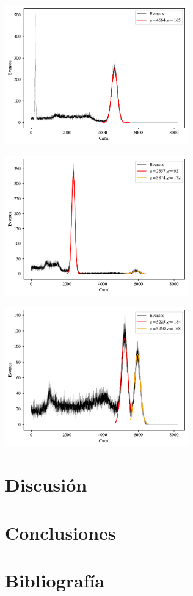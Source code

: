 \documentclass[onecolumn]{article}
\begin{document}
		\begin{center}
			\includegraphics[width=225pt]{img/nai_33_cs_137.pdf}
		\end{center}

		\begin{center}
			\includegraphics[width=225pt]{img/nai_33_na_22.pdf}
		\end{center}

		\begin{center}
			\includegraphics[width=225pt]{img/nai_33_co_60.pdf}
		\end{center}

	\section{Discusión}
	\section{Conclusiones}
	\section{Bibliografía}
\end{document}
